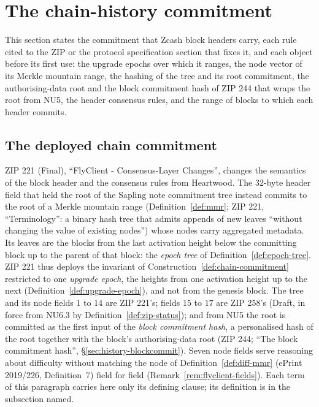 \documentclass[11pt,a4paper]{article}
\theoremstyle{definition}
\begin{document}
\section{The chain-history commitment}\label{sec:history}

This section states the commitment that Zcash block headers carry, each rule
cited to the ZIP or the protocol specification section that fixes it, and
each object before its first use: the upgrade epochs over which it ranges,
the node vector of its Merkle mountain range, the hashing of the tree and its
root commitment, the authorising-data root and the block commitment hash of
ZIP 244 that wraps the root from NU5, the header consensus rules, and the
range of blocks to which each header commits.

\subsection{The deployed chain commitment}\label{sec:history-deployed}

ZIP 221 (Final), ``FlyClient - Consensus-Layer Changes'', changes the
semantics of the block header and the consensus rules from Heartwood. The
$32$-byte header field that held the root of the Sapling note commitment tree
instead commits to the root of a Merkle mountain range
(Definition~\ref{def:mmr}; ZIP 221, ``Terminology'': a binary hash tree that
admits appends of new leaves ``without changing the value of existing
nodes'') whose nodes carry aggregated metadata. Its leaves are the blocks from
the last activation height below the committing block up to the parent of
that block: the \emph{epoch tree} of Definition~\ref{def:epoch-tree}. ZIP 221
thus deploys the invariant of Construction~\ref{def:chain-commitment}
restricted to one \emph{upgrade epoch}, the heights from one activation
height up to the next (Definition~\ref{def:upgrade-epoch}), and not from the
genesis block. The tree and its node fields $1$ to $14$ are ZIP 221's; fields
$15$ to $17$ are ZIP 258's (Draft, in force from NU6.3 by
Definition~\ref{def:zip-status}); and from NU5 the root is committed as the
first input of the \emph{block commitment hash}, a personalised hash of the
root together with the block's authorising-data root (ZIP 244; ``The block
commitment hash'', \S\ref{sec:history-blockcommit}). Seven node fields serve
reasoning about difficulty without matching the node of
Definition~\ref{def:diff-mmr} (ePrint 2019/226, Definition~7) field for field
(Remark~\ref{rem:flyclient-fields}). Each term of this paragraph carries here
only its defining clause; its definition is in the subsection named.
\end{document}
